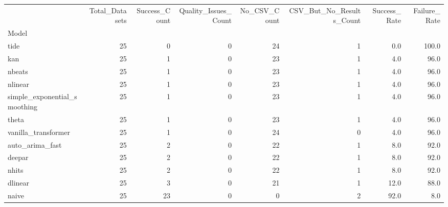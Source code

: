 \begin{tabular}{lrrrrrrr}
\toprule
 & Total_Datasets & Success_Count & Quality_Issues_Count & No_CSV_Count & CSV_But_No_Results_Count & Success_Rate & Failure_Rate \\
Model &  &  &  &  &  &  &  \\
\midrule
tide & 25 & 0 & 0 & 24 & 1 & 0.0 & 100.0 \\
kan & 25 & 1 & 0 & 23 & 1 & 4.0 & 96.0 \\
nbeats & 25 & 1 & 0 & 23 & 1 & 4.0 & 96.0 \\
nlinear & 25 & 1 & 0 & 23 & 1 & 4.0 & 96.0 \\
simple_exponential_smoothing & 25 & 1 & 0 & 23 & 1 & 4.0 & 96.0 \\
theta & 25 & 1 & 0 & 23 & 1 & 4.0 & 96.0 \\
vanilla_transformer & 25 & 1 & 0 & 24 & 0 & 4.0 & 96.0 \\
auto_arima_fast & 25 & 2 & 0 & 22 & 1 & 8.0 & 92.0 \\
deepar & 25 & 2 & 0 & 22 & 1 & 8.0 & 92.0 \\
nhits & 25 & 2 & 0 & 22 & 1 & 8.0 & 92.0 \\
dlinear & 25 & 3 & 0 & 21 & 1 & 12.0 & 88.0 \\
naive & 25 & 23 & 0 & 0 & 2 & 92.0 & 8.0 \\
\bottomrule
\end{tabular}